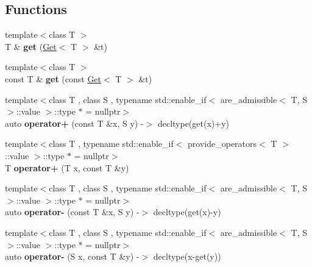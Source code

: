 \subsection*{Functions}
\begin{DoxyCompactItemize}
\item 
{\footnotesize template$<$class T $>$ }\\T \& {\bfseries get} (\hyperlink{classSpacy_1_1Mixin_1_1Get}{Get}$<$ T $>$ \&t)\hypertarget{namespaceSpacy_1_1Mixin_ae8e011b6a3a8c86985e72e90ecb50dbd}{}\label{namespaceSpacy_1_1Mixin_ae8e011b6a3a8c86985e72e90ecb50dbd}

\item 
{\footnotesize template$<$class T $>$ }\\const T \& {\bfseries get} (const \hyperlink{classSpacy_1_1Mixin_1_1Get}{Get}$<$ T $>$ \&t)\hypertarget{namespaceSpacy_1_1Mixin_a56dd66023bc5a5795d8caef26df24a01}{}\label{namespaceSpacy_1_1Mixin_a56dd66023bc5a5795d8caef26df24a01}

\item 
{\footnotesize template$<$class T , class S , typename std\+::enable\+\_\+if$<$ are\+\_\+admissible$<$ T, S $>$\+::value $>$\+::type $\ast$  = nullptr$>$ }\\auto {\bfseries operator+} (const T \&x, S y) -\/$>$ decltype(get(x)+y)\hypertarget{namespaceSpacy_1_1Mixin_a350150e68052436ddc8a683316cba5ae}{}\label{namespaceSpacy_1_1Mixin_a350150e68052436ddc8a683316cba5ae}

\item 
{\footnotesize template$<$class T , typename std\+::enable\+\_\+if$<$ provide\+\_\+operators$<$ T $>$\+::value $>$\+::type $\ast$  = nullptr$>$ }\\T {\bfseries operator+} (T x, const T \&y)\hypertarget{namespaceSpacy_1_1Mixin_a975f77a91bcd4a183664c165e2fa9562}{}\label{namespaceSpacy_1_1Mixin_a975f77a91bcd4a183664c165e2fa9562}

\item 
{\footnotesize template$<$class T , class S , typename std\+::enable\+\_\+if$<$ are\+\_\+admissible$<$ T, S $>$\+::value $>$\+::type $\ast$  = nullptr$>$ }\\auto {\bfseries operator-\/} (const T \&x, S y) -\/$>$ decltype(get(x)-\/y)\hypertarget{namespaceSpacy_1_1Mixin_a366404e0de77c563fa9a833de599c722}{}\label{namespaceSpacy_1_1Mixin_a366404e0de77c563fa9a833de599c722}

\item 
{\footnotesize template$<$class T , class S , typename std\+::enable\+\_\+if$<$ are\+\_\+admissible$<$ T, S $>$\+::value $>$\+::type $\ast$  = nullptr$>$ }\\auto {\bfseries operator-\/} (S x, const T \&y) -\/$>$ decltype(x-\/get(y))\hypertarget{namespaceSpacy_1_1Mixin_a416e48c39a8fa66363f266e6eec8abd1}{}\label{namespaceSpacy_1_1Mixin_a416e48c39a8fa66363f266e6eec8abd1}


\end{DoxyCompactItemize}
